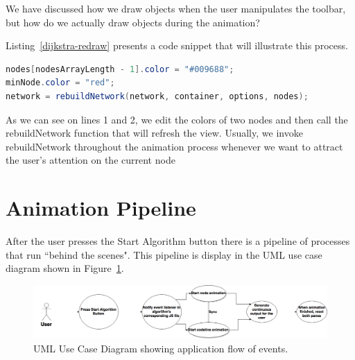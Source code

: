 \documentclass{l4proj}
\begin{document}
We have discussed how we draw objects when the user manipulates the toolbar, but how do we actually draw objects during
the animation? 

 Listing~\ref{dijkstra-redraw} presents a code snippet that will illustrate this process.

\begin{lstlisting}[language={Java}, label={dijkstra-redraw},caption={Network redraw in Dijkstra's algorithm.}]
nodes[nodesArrayLength - 1].color = "#009688";
minNode.color = "red";
network = rebuildNetwork(network, container, options, nodes);
\end{lstlisting}

As we can see on lines 1 and 2, we edit the colors of two nodes and then call the rebuildNetwork function that will
refresh the view. Usually, we invoke rebuildNetwork throughout the animation process whenever we want to attract the
user's attention on the current node 

\section{Animation Pipeline}

After the user presses the Start Algorithm button there is a pipeline of processes that run ``behind the
scenes". This pipeline is display in the UML use case diagram shown in
Figure~\ref{fig:animation_uml_use_case_diagram}.

\begin{figure}[!ht]
    \centering
    \includegraphics[scale=0.3]{animation_uml_use_case_diagram}
    \caption{UML Use Case Diagram showing application flow of events.}
    \label{fig:animation_uml_use_case_diagram}
\end{figure}
\end{document}
